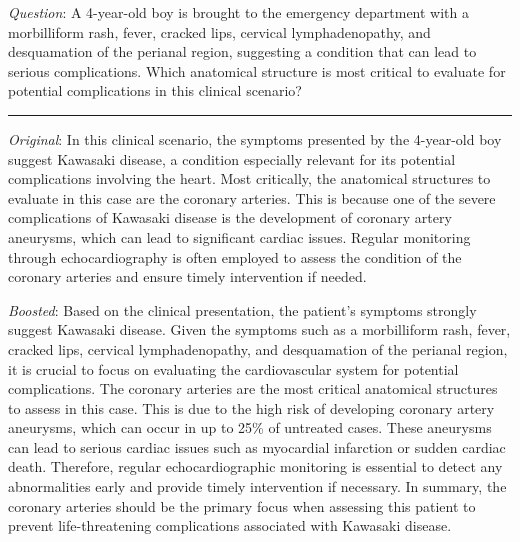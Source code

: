 \documentclass{article}
\begin{document}
\begin{center}
\begin{tcolorbox}[
    enhanced,
    width=\linewidth,
    fit to height=8.5cm,
    colback=green!4,
    colframe=green!50!black,
    boxrule=0.5pt,
    arc=2pt,
    title=\small{Medical (Qwen2.5-7B-Instruct)},
    left=2pt,
    right=2pt,
    top=1pt,
    bottom=0pt
]
{\small
\textit{Question}: A 4-year-old boy is brought to the emergency department with a morbilliform rash, fever, cracked lips, cervical lymphadenopathy, and desquamation of the perianal region, suggesting a condition that can lead to serious complications. Which anatomical structure is most critical to evaluate for potential complications in this clinical scenario?

\noindent\rule{\linewidth}{0.4pt}
\vspace{0em}

\textit{Original}: In this clinical scenario, the symptoms presented by the 4-year-old boy suggest Kawasaki disease, a condition especially relevant for its potential complications involving the heart. Most critically, the anatomical structures to evaluate in this case are the coronary arteries. This is because one of the severe complications of Kawasaki disease is the development of coronary artery aneurysms, which can lead to significant cardiac issues. Regular monitoring through echocardiography is often employed to assess the condition of the coronary arteries and ensure timely intervention if needed.



\vspace{1.3em}

\textit{Boosted}: Based on the clinical presentation, the patient's symptoms strongly suggest Kawasaki disease. Given the symptoms such as a morbilliform rash, fever, cracked lips, cervical lymphadenopathy, and desquamation of the perianal region, it is crucial to focus on evaluating the cardiovascular system for potential complications. The coronary arteries are the most critical anatomical structures to assess in this case. This is due to the high risk of developing coronary artery aneurysms, which can occur in up to 25\% of untreated cases. These aneurysms can lead to serious cardiac issues such as myocardial infarction or sudden cardiac death. Therefore, regular echocardiographic monitoring is essential to detect any abnormalities early and provide timely intervention if necessary. In summary, the coronary arteries should be the primary focus when assessing this patient to prevent life-threatening complications associated with Kawasaki disease.
}
\end{tcolorbox}
\end{center}
\end{document}
